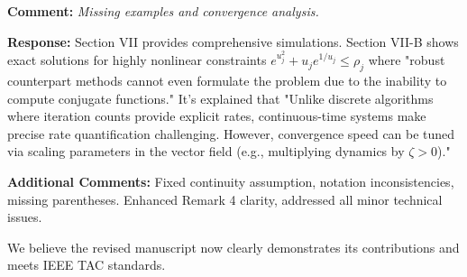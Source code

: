 \documentclass[journal,twoside,web]{ieeecolor}
\begin{document}
\textbf{Comment:} \textit{Missing examples and convergence analysis.}

\textbf{Response:} Section VII provides comprehensive simulations. Section VII-B shows exact solutions for highly nonlinear constraints $e^{u_j^2}+u_j e^{1/u_j} \leq \rho_j$ where "robust counterpart methods cannot even formulate the problem due to the inability to compute conjugate functions." It's explained that "Unlike discrete algorithms where iteration counts provide explicit rates, continuous-time systems make precise rate quantification challenging. However, convergence speed can be tuned via scaling parameters in the vector field (e.g., multiplying dynamics by $\zeta > 0$)."

\textbf{Additional Comments:} Fixed continuity assumption, notation inconsistencies, missing parentheses. Enhanced Remark 4 clarity, addressed all minor technical issues.

We believe the revised manuscript now clearly demonstrates its contributions and meets IEEE TAC standards.
\end{document}
